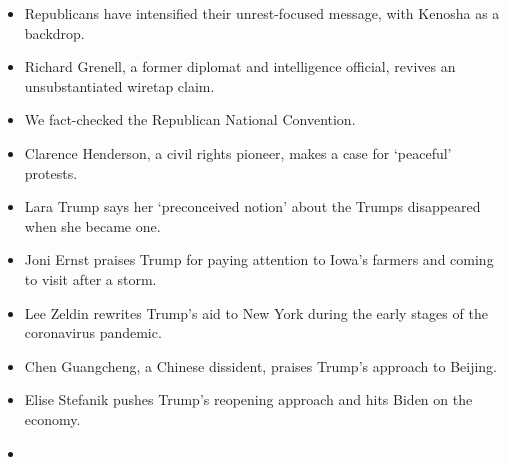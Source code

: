 \begin{itemize}
\item
  \protect\hyperlink{republicans-have-intensified-their-unrest-focused-message-with-kenosha-as-a-backdrop}{}

  Republicans have intensified their unrest-focused message, with
  Kenosha as a backdrop.
\item
  \protect\hyperlink{richard-grenell-a-former-diplomat-and-intelligence-official-revives-an-unsubstantiated-wiretap-claim}{}

  Richard Grenell, a former diplomat and intelligence official, revives
  an unsubstantiated wiretap claim.
\item
  \protect\hyperlink{we-fact-checked-the-republican-national-convention}{}

  We fact-checked the Republican National Convention.
\item
  \protect\hyperlink{clarence-henderson-a-civil-rights-pioneer-makes-a-case-for-peaceful-protests}{}

  Clarence Henderson, a civil rights pioneer, makes a case for
  `peaceful' protests.
\item
  \protect\hyperlink{lara-trump-says-her-preconceived-notion-about-the-trumps-disappeared-when-she-became-one}{}

  Lara Trump says her `preconceived notion' about the Trumps disappeared
  when she became one.
\item
  \protect\hyperlink{joni-ernst-praises-trump-for-paying-attention-to-iowas-farmers-and-coming-to-visit-after-a-storm}{}

  Joni Ernst praises Trump for paying attention to Iowa's farmers and
  coming to visit after a storm.
\item
  \protect\hyperlink{lee-zeldin-rewrites-trumps-aid-to-new-york-during-the-early-stages-of-the-coronavirus-pandemic}{}

  Lee Zeldin rewrites Trump's aid to New York during the early stages of
  the coronavirus pandemic.
\item
  \protect\hyperlink{chen-guangcheng-a-chinese-dissident-praises-trumps-approach-to-beijing}{}

  Chen Guangcheng, a Chinese dissident, praises Trump's approach to
  Beijing.
\item
  \protect\hyperlink{elise-stefanik-pushes-trumps-reopening-approach-and-hits-biden-on-the-economy}{}

  Elise Stefanik pushes Trump's reopening approach and hits Biden on the
  economy.
\item
  \protect\hyperlink{kellyanne-conway-is-leaving-the-white-house-but-not-the-spotlight}{}


\end{itemize}
